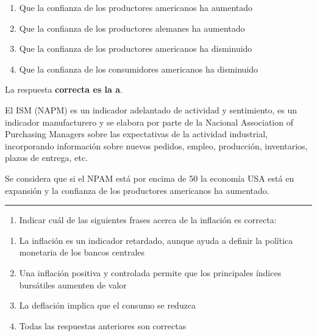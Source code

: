 \documentclass[
  letterpaper,
  DIV=11,
  numbers=noendperiod]{scrreprt}
\providecommand{\tightlist}{%
  \setlength{\itemsep}{0pt}\setlength{\parskip}{0pt}}\usepackage{longtable,booktabs,array}
\begin{document}
\begin{enumerate}
\def\labelenumi{\alph{enumi})}
\item
  Que la confianza de los productores americanos ha aumentado
\item
  Que la confianza de los productores alemanes ha aumentado
\item
  Que la confianza de los productores americanos ha disminuido
\item
  Que la confianza de los consumidores americanos ha disminuido
\end{enumerate}

\begin{tcolorbox}[enhanced jigsaw, left=2mm, opacityback=0, colback=white, breakable, arc=.35mm, bottomrule=.15mm, rightrule=.15mm, toprule=.15mm, leftrule=.75mm, colframe=quarto-callout-tip-color-frame]
\begin{minipage}[t]{5.5mm}
\textcolor{quarto-callout-tip-color}{\faLightbulb}
\end{minipage}%
\begin{minipage}[t]{\textwidth - 5.5mm}

La respuesta \textbf{correcta es la a}.

El ISM (NAPM) es un indicador adelantado de actividad y sentimiento, es
un indicador manufacturero y se elabora por parte de la Nacional
Association of Purchasing Managers sobre las expectativas de la
actividad industrial, incorporando información sobre nuevos pedidos,
empleo, producción, inventarios, plazos de entrega, etc.

Se considera que si el NPAM está por encima de 50 la economía USA está
en expansión y la confianza de los productores americanos ha aumentado.

\end{minipage}%
\end{tcolorbox}

\begin{center}\rule{0.5\linewidth}{0.5pt}\end{center}

\begin{enumerate}
\def\labelenumi{\arabic{enumi}.}
\setcounter{enumi}{22}
\tightlist
\item
  Indicar cuál de las siguientes frases acerca de la inflación es
  correcta:
\end{enumerate}

\begin{enumerate}
\def\labelenumi{\alph{enumi})}
\item
  La inflación es un indicador retardado, aunque ayuda a definir la
  política monetaria de los bancos centrales
\item
  Una inflación positiva y controlada permite que los principales
  índices bursátiles aumenten de valor
\item
  La deflación implica que el consumo se reduzca
\item
  Todas las respuestas anteriores son correctas
\end{enumerate}
\end{document}
